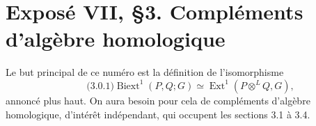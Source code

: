 \documentclass[11pt]{article}
\providecommand{\Ker}{\operatorname{Ker}}
\providecommand{\Ext}{\operatorname{Ext}}
\providecommand{\id}{\operatorname{id}}
\begin{document}
\providecommand{\Biext}{\operatorname{Biext}}
\providecommand{\GrAb}{\operatorname{GrAb}}
\providecommand{\Coker}{\operatorname{Coker}}
\providecommand{\coker}{\operatorname{coker}}
\providecommand{\Ker}{\operatorname{Ker}}
\providecommand{\cofib}{\operatorname{cofib}}
\providecommand{\Dcat}{\mathrm D}
\providecommand{\Kcat}{\mathrm K}
\providecommand{\cPsi}{\mathcal\Psi}
\providecommand{\cY}{\mathcal Y}
\providecommand{\cC}{\mathcal C}
\providecommand{\cT}{\mathcal T}
\providecommand{\Hh}{\mathrm H}
\providecommand{\Tot}{\operatorname{Tot}}
\providecommand{\id}{\operatorname{id}}


\section*{Expos\'e VII, \S3. Compl\'ements d'alg\`ebre homologique}

Le but principal de ce num\'ero est la d\'efinition de l'isomorphisme
\begin{equation}\qquad\text{(3.0.1)}
  \Biext^1(P,Q;G)\simeq \Ext^1(P\otimes^{L}Q,G),
\end{equation}
annonc\'e plus haut.  On aura besoin pour cela de compl\'ements d'alg\`ebre homologique, d'int\'er\^et ind\'ependant, qui occupent les sections 3.1 \`a 3.4.
\end{document}
